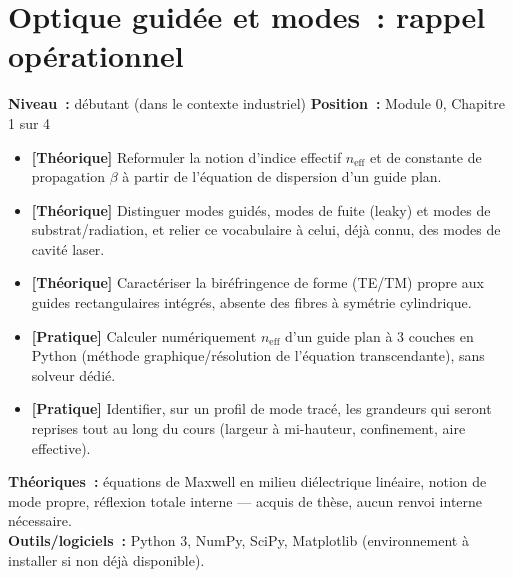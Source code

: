 
\chapter{Optique guidée et modes~: rappel opérationnel}
\label{chap:m0-optique}

\noindent\textbf{Niveau~:} débutant (dans le contexte industriel) \hfill
\textbf{Position~:} Module 0, Chapitre 1 sur 4

\begin{objectifs}
\begin{itemize}[leftmargin=1.4em]
  \item \textbf{[Théorique]} Reformuler la notion d'indice effectif $n_{\text{eff}}$ et de constante de propagation $\beta$ à partir de l'équation de dispersion d'un guide plan.
  \item \textbf{[Théorique]} Distinguer modes guidés, modes de fuite (leaky) et modes de substrat/radiation, et relier ce vocabulaire à celui, déjà connu, des modes de cavité laser.
  \item \textbf{[Théorique]} Caractériser la biréfringence de forme (TE/TM) propre aux guides rectangulaires intégrés, absente des fibres à symétrie cylindrique.
  \item \textbf{[Pratique]} Calculer numériquement $n_{\text{eff}}$ d'un guide plan à 3 couches en Python (méthode graphique/résolution de l'équation transcendante), sans solveur dédié.
  \item \textbf{[Pratique]} Identifier, sur un profil de mode tracé, les grandeurs qui seront reprises tout au long du cours (largeur à mi-hauteur, confinement, aire effective).
\end{itemize}
\end{objectifs}

\begin{prerequis}
\textbf{Théoriques~:} équations de Maxwell en milieu diélectrique linéaire, notion de mode propre, réflexion totale interne — acquis de thèse, aucun renvoi interne nécessaire.\\
\textbf{Outils/logiciels~:} Python 3, NumPy, SciPy, Matplotlib (environnement à installer si non déjà disponible).
\end{prerequis}

